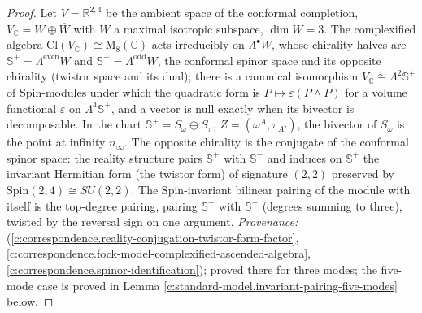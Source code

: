 \documentclass[11pt]{article}
\theoremstyle{definition}
\theoremstyle{plain}
\providecommand{\C}{}\renewcommand{\C}{\mathbb{C}}
\providecommand{\CS}{}\renewcommand{\CS}{{\mathbb{S}^{+}}}
\providecommand{\CSm}{}\renewcommand{\CSm}{{\mathbb{S}^{-}}}
\providecommand{\Cl}{}\renewcommand{\Cl}{\mathrm{Cl}}
\providecommand{\R}{}\renewcommand{\R}{\mathbb{R}}
\providecommand{\Som}{}\renewcommand{\Som}{S_\omega}
\providecommand{\Spi}{}\renewcommand{\Spi}{S_\pi}
\begin{document}
\begin{proof}
Let $V = \R^{2,4}$ be the ambient space of the conformal completion, $V_{\C} = W \oplus \overline{W}$ with $W$ a maximal isotropic subspace, $\dim W = 3$. The complexified algebra $\Cl(V_{\C}) \cong \mathrm{M}_{8}(\C)$ acts irreducibly on $\Lambda^{\bullet}W$, whose chirality halves are $\CS = \Lambda^{\mathrm{even}}W$ and $\CSm = \Lambda^{\mathrm{odd}}W$, the conformal spinor space and its opposite chirality (twistor space and its dual); there is a canonical isomorphism $V_{\C} \cong \Lambda^{2}\CS$ of $\mathrm{Spin}$-modules under which the quadratic form is $P \mapsto \varepsilon(P \wedge P)$ for a volume functional $\varepsilon$ on $\Lambda^{4}\CS$, and a vector is null exactly when its bivector is decomposable. In the chart $\CS = \Som \oplus \Spi$, $Z = (\omega^{A}, \pi_{A'})$, the bivector of $\Som$ is the point at infinity $n_{\infty}$. The opposite chirality is the conjugate of the conformal spinor space: the reality structure pairs $\CS$ with $\CSm$ and induces on $\CS$ the invariant Hermitian form (the twistor form) of signature $(2,2)$ preserved by $\mathrm{Spin}(2,4) \cong SU(2,2)$. The $\mathrm{Spin}$-invariant bilinear pairing of the module with itself is the top-degree pairing, pairing $\CS$ with $\CSm$ (degrees summing to three), twisted by the reversal sign on one argument. \emph{Provenance:} \cite[Thms.~3.1, 3.4, Prop.~4.5]{ButlerT9} (\ref{c:correspondence.reality-conjugation-twistor-form-factor}, \ref{c:correspondence.fock-model-complexified-ascended-algebra}, \ref{c:correspondence.spinor-identification}); proved there for three modes; the five-mode case is proved in Lemma \ref{c:standard-model.invariant-pairing-five-modes} below.

\end{proof}
\end{document}

